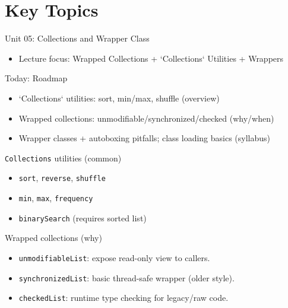 \documentclass{beamer}
\begin{document}
\section{Key Topics}
\label{sec:concepts}

\begin{frame}{Unit 05: Collections and Wrapper Class}
  \begin{itemize}[<+->]
    \item Lecture focus: Wrapped Collections + `Collections` Utilities + Wrappers
  \end{itemize}
  \slidesources{\OOPSUnitVSources}
\end{frame}

\begin{frame}{Today: Roadmap}
  \begin{itemize}[<+->]
    \item `Collections` utilities: sort, min/max, shuffle (overview)
    \item Wrapped collections: unmodifiable/synchronized/checked (why/when)
    \item Wrapper classes + autoboxing pitfalls; class loading basics (syllabus)
  \end{itemize}
  \slidesources{\OOPSUnitVSources}
\end{frame}

\begin{frame}{\texttt{Collections} utilities (common)}
  \begin{itemize}[<+->]
    \item \texttt{sort}, \texttt{reverse}, \texttt{shuffle}
    \item \texttt{min}, \texttt{max}, \texttt{frequency}
    \item \texttt{binarySearch} (requires sorted list)
  \end{itemize}
  \slidesources{\OOPSUnitVSources}
\end{frame}

\begin{frame}{Wrapped collections (why)}
  \begin{itemize}[<+->]
    \item \texttt{unmodifiableList}: expose read-only view to callers.
    \item \texttt{synchronizedList}: basic thread-safe wrapper (older style).
    \item \texttt{checkedList}: runtime type checking for legacy/raw code.
  \end{itemize}
  \slidesources{\OOPSUnitVSources}
\end{frame}
\end{document}
